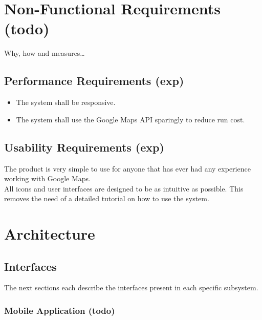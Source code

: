 \documentclass{article}
\begin{document}
    \newpage


    \section{Non-Functional Requirements (todo)}

    Why, how and measures\ldots

    \subsection{Performance Requirements (exp)}
    \begin{itemize}
        \item
            The system shall be responsive.
        \item
            The system shall use the Google Maps API sparingly to reduce run
            cost.
    \end{itemize}

    \subsection{Usability Requirements (exp)}

    The product is very simple to use for anyone that has ever had any
    experience working with Google Maps.\\ All icons and user interfaces are
    designed to be as intuitive as possible. This removes the need of a detailed
    tutorial on how to use the system.

    \newpage


    \section{Architecture}


    \subsection{Interfaces}

    The next sections each describe the interfaces present in each specific
    subsystem.

    \subsubsection{Mobile Application (todo)}
\end{document}
